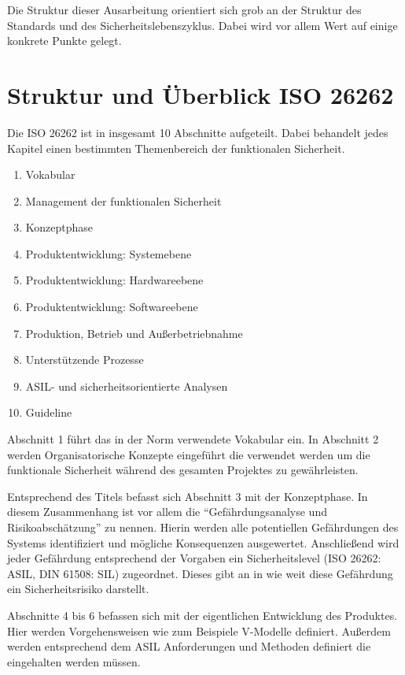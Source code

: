\documentclass[a4paper,DIV=calc,ngerman]{scrartcl}
\begin{document}
Die Struktur dieser Ausarbeitung orientiert sich grob an der Struktur des Standards und des Sicherheitslebenszyklus. Dabei wird vor allem Wert auf einige konkrete Punkte gelegt.

\section{Struktur und Überblick ISO 26262}
\label{sec:Struktur}
Die ISO 26262 ist in insgesamt 10 Abschnitte aufgeteilt. Dabei behandelt jedes Kapitel einen bestimmten Themenbereich der funktionalen Sicherheit.

\begin{enumerate}
    \item Vokabular
    \item Management der funktionalen Sicherheit
    \item Konzeptphase
    \item Produktentwicklung: Systemebene
    \item Produktentwicklung: Hardwareebene
    \item Produktentwicklung: Softwareebene
    \item Produktion, Betrieb und Außerbetriebnahme
    \item Unterstützende Prozesse
    \item ASIL- und sicherheitsorientierte Analysen
    \item Guideline
\end{enumerate}

Abschnitt 1 führt das in der Norm verwendete Vokabular ein. In Abschnitt 2 werden Organisatorische Konzepte eingeführt die verwendet werden um die funktionale Sicherheit während des gesamten Projektes zu gewährleisten.

Entsprechend des Titels befasst sich Abschnitt 3 mit der Konzeptphase. In diesem Zusammenhang ist vor allem die "`Gefährdungsanalyse und Risikoabschätzung"' zu nennen. Hierin werden alle potentiellen Gefährdungen des Systems identifiziert und mögliche Konsequenzen ausgewertet. Anschließend wird jeder Gefährdung entsprechend der Vorgaben ein Sicherheitslevel (ISO 26262: ASIL, DIN 61508: SIL) zugeordnet. Dieses gibt an in wie weit diese Gefährdung ein Sicherheitsrisiko darstellt.

Abschnitte 4 bis 6 befassen sich mit der eigentlichen Entwicklung des Produktes. Hier werden Vorgehensweisen wie zum Beispiele V-Modelle definiert. Außerdem werden entsprechend dem ASIL Anforderungen und Methoden definiert die eingehalten werden müssen.
\end{document}
